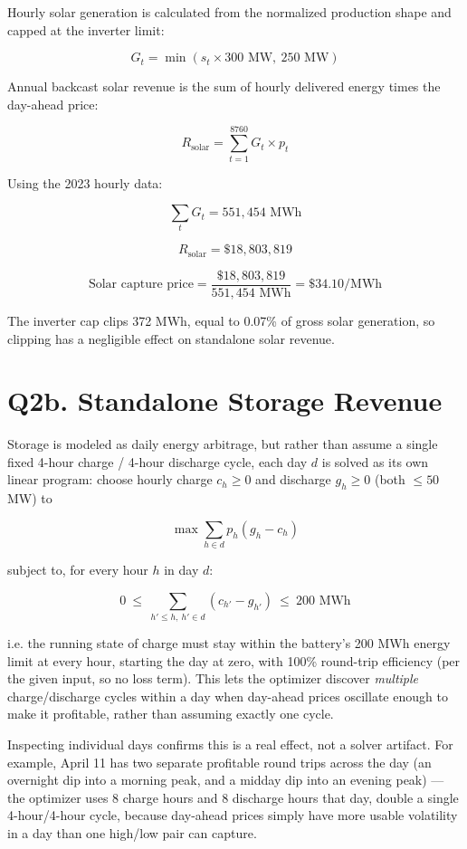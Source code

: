 \documentclass[11pt]{article}
\begin{document}
Hourly solar generation is calculated from the normalized production shape and
capped at the inverter limit:

\[
G_t = \min(s_t \times 300\text{ MW},\ 250\text{ MW})
\]

Annual backcast solar revenue is the sum of hourly delivered energy times the
day-ahead price:

\[
R_{\text{solar}} = \sum_{t=1}^{8760} G_t \times p_t
\]

Using the 2023 hourly data:

\[
\sum_t G_t = 551{,}454\text{ MWh}
\]

\[
R_{\text{solar}} = \$18{,}803{,}819
\]

\[
\text{Solar capture price}
= \frac{\$18{,}803{,}819}{551{,}454\text{ MWh}}
= \$34.10/\text{MWh}
\]

The inverter cap clips 372 MWh, equal to 0.07\% of gross solar generation, so
clipping has a negligible effect on standalone solar revenue.

\section*{Q2b. Standalone Storage Revenue}

Storage is modeled as daily energy arbitrage, but rather than assume a single fixed
4-hour charge / 4-hour discharge cycle, each day $d$ is solved as its own linear program:
choose hourly charge $c_h \geq 0$ and discharge $g_h \geq 0$ (both $\leq 50$ MW) to

\[
\max \sum_{h \in d} p_h (g_h - c_h)
\]

subject to, for every hour $h$ in day $d$:

\[
0 \ \leq\ \sum_{h' \leq h,\ h' \in d} (c_{h'} - g_{h'}) \ \leq\ 200\text{ MWh}
\]

i.e. the running state of charge must stay within the battery's 200 MWh energy limit
at every hour, starting the day at zero, with 100\% round-trip efficiency (per the given
input, so no loss term). This lets the optimizer discover \emph{multiple} charge/discharge
cycles within a day when day-ahead prices oscillate enough to make it profitable, rather
than assuming exactly one cycle.

Inspecting individual days confirms this is a real effect, not a solver artifact. For
example, April 11 has two separate profitable round trips across the day (an overnight
dip into a morning peak, and a midday dip into an evening peak) --- the optimizer uses 8
charge hours and 8 discharge hours that day, double a single 4-hour/4-hour cycle, because
day-ahead prices simply have more usable volatility in a day than one high/low pair can
capture.
\end{document}
